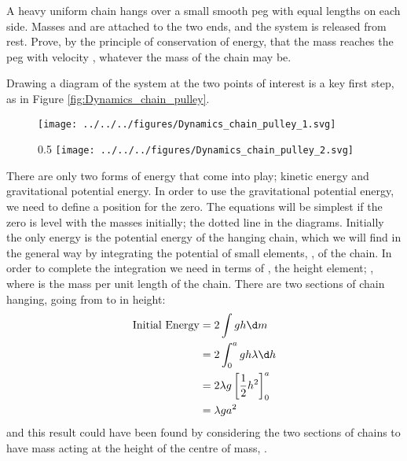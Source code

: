 

\begin{problem} %
 {A heavy uniform chain hangs over a small smooth peg with equal lengths  on each side.  Masses  and  are attached to the two ends, and the system is released from rest.  Prove, by the principle of conservation of energy, that the mass  reaches the peg with velocity , whatever the mass of the chain may be.}
{}
{Drawing a diagram of the system at the two points of interest is a key first step, as in Figure \ref{fig:Dynamics_chain_pulley}.

\begin{figure}[h]
  \centering
 	\texttt{[image: ../../../figures/Dynamics\_chain\_pulley\_1.svg]}
	\caption{}\label{fig:Dynamics_chain_pulley_1}
\end{figure}
\begin{figure}{0.5\textwidth}
	\centering
	\texttt{[image: ../../../figures/Dynamics\_chain\_pulley\_2.svg]}
	\caption{}\label{fig:Dynamics_chain_pulley_2}
\end{figure}

There are only two forms of energy that come into play; kinetic energy and gravitational potential energy. In order to use the gravitational potential energy, we need to define a position for the zero. The equations will be simplest if the zero is level with the masses initially; the dotted line in the diagrams. Initially the only energy is the potential energy of the hanging chain, which we will find in the general way by integrating the potential of small elements, , of the chain. In order to complete the integration we need  in terms of , the height element; , where \vari{\lambda} is the mass per unit length of the chain. There are two sections of chain hanging, going from  to  in height:
\begin{eqnarray*} 
\text{Initial Energy} &= 2 \int gh \d m \\ 
&= 2 \int_{0}^{a} gh \lambda \d h \\ 
&= 2\lambda g\left[\frac{1}{2}h^{2}\right]_{0}^{a} \\ 
&= \lambda ga^{2} 
\end{eqnarray*}
and this result could have been found by considering the two sections of chains to have mass  acting at the height of the centre of mass, .

}
\end{problem}

